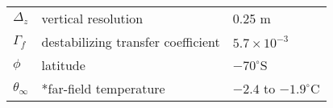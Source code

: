 \begin{table}[H]
\begin{center}
\begin{tabular}{lll}
	$\Delta_z$      & vertical resolution       & 0.25 m\\
    $\Gamma_f$   & destabilizing transfer coefficient & $5.7 \times 10^{-3}$\\%
	$\phi$ & latitude & $-70^{\circ}$S \\
	$\theta_{\infty}$      & *far-field temperature     & $-2.4$ to $-1.9^{\circ}$C \\
    \hline
    \end{tabular}
    \end{center}
    \end{table}
